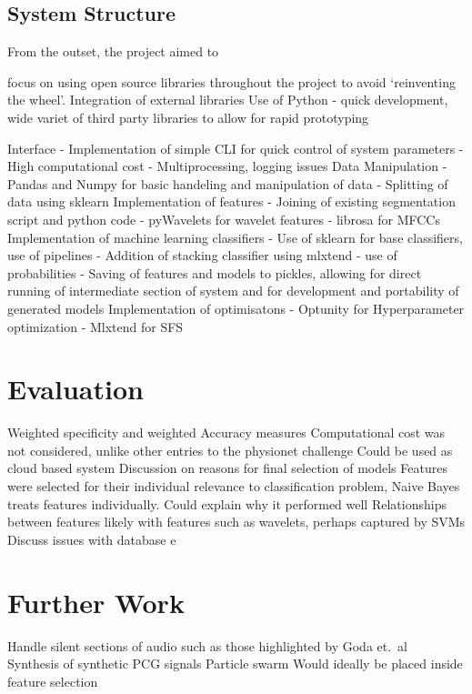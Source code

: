 \documentclass[titlepage, 12pt]{scrartcl} \usepackage{enumitem}
\begin{document}
\subsection{System Structure}
From the outset, the project aimed to 

focus on using open source libraries throughout the project to avoid
`reinventing the wheel'. Integration of external libraries
Use of Python - quick development, wide variet of third party libraries to
allow for rapid prototyping


Interface
- Implementation of simple CLI for quick control of system parameters
- High computational cost - Multiprocessing, logging issues
Data Manipulation
- Pandas and Numpy for basic handeling and manipulation of data
- Splitting of data using sklearn
Implementation of features
- Joining of existing segmentation script and python code
- pyWavelets for wavelet features
- librosa for MFCCs
Implementation of machine learning classifiers
- Use of sklearn for base classifiers, use of pipelines
- Addition of stacking classifier using mlxtend - use of probabilities
- Saving of features and models to pickles, allowing for direct running of
intermediate section of system and for development and portability of generated models
Implementation of optimisatons
- Optunity for Hyperparameter optimization
- Mlxtend for SFS




\section{Evaluation}\label{Eval}
Weighted specificity and weighted Accuracy measures
Computational cost was not considered, unlike other entries to the physionet
challenge
Could be used as cloud based system
Discussion on reasons for final selection of models
Features were selected for their individual relevance to classification
problem, Naive Bayes treats features individually. Could explain why it
performed well
Relationships between features likely with features such as wavelets, perhaps
captured by SVMs
Discuss issues with database e
\section{Further Work}\label{FurtherWork}
Handle silent sections of audio such as those highlighted by Goda et.\
al~\parencite{Goda2016}
Synthesis of synthetic PCG signals
Particle swarm Would ideally be placed inside feature selection
\end{document}
